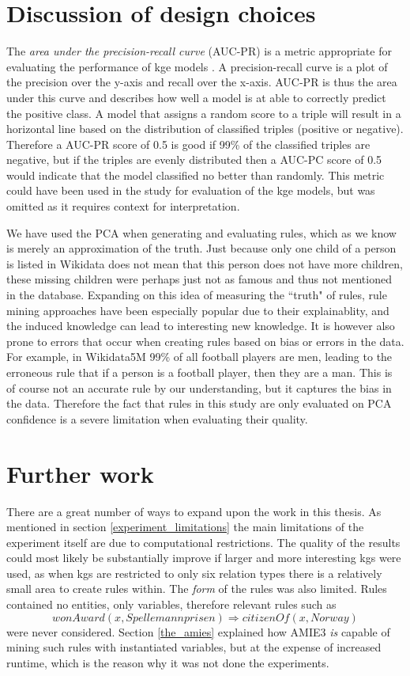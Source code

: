 \section{Discussion of design choices}
The \textit{area under the precision-recall curve} (AUC-PR) is a metric appropriate for evaluating the performance of \gls{kge} models \cite{jahn2021reasoning}. A precision-recall curve is a plot of the precision over the y-axis and recall over the x-axis. AUC-PR is thus the area under this curve and describes how well a model is at able to correctly predict the positive class. A model that assigns a random score to a triple will result in a horizontal line based on the distribution of classified triples (positive or negative). Therefore a AUC-PR score of 0.5 is good if 99\% of the classified triples are negative, but if the triples are evenly distributed then a AUC-PC score of 0.5 would indicate that the model classified no better than randomly. This metric could have been used in the study for evaluation of the \gls{kge} models, but was omitted as it requires context for interpretation.

We have used the PCA when generating and evaluating rules, which as we know is merely an approximation of the truth. Just because only one child of a person is listed in Wikidata does not mean that this person does not have more children, these missing children were perhaps just not as famous and thus not mentioned in the database. Expanding on this idea of measuring the ``truth" of rules, rule mining approaches have been especially popular due to their explainablity, and the induced knowledge can lead to interesting new knowledge. It is however also prone to errors that occur when creating rules based on bias or errors in the data. For example, in Wikidata5M 99\% of all football players are men, leading to the erroneous rule that if a person is a football player, then they are a man. This is of course not an accurate rule by our understanding, but it captures the bias in the data. Therefore the fact that rules in this study are only evaluated on PCA confidence is a severe limitation when evaluating their quality.

\section{Further work}
There are a great number of ways to expand upon the work in this thesis. As mentioned in section \ref{experiment_limitations} the main limitations of the experiment itself are due to computational restrictions. The quality of the results could most likely be substantially improve if larger and more interesting \glspl{kg} were used, as when \glspl{kg} are restricted to only six relation types there is a relatively small area to create rules within. The \textit{form} of the rules was also limited. Rules contained no entities, only variables, therefore relevant rules such as
\[wonAward(x, Spellemannprisen) \Rightarrow citizenOf(x, Norway)\]
were never considered. Section \ref{the_amies} explained how AMIE3 \textit{is} capable of mining such rules with instantiated variables, but at the expense of increased runtime, which is the reason why it was not done the experiments.

